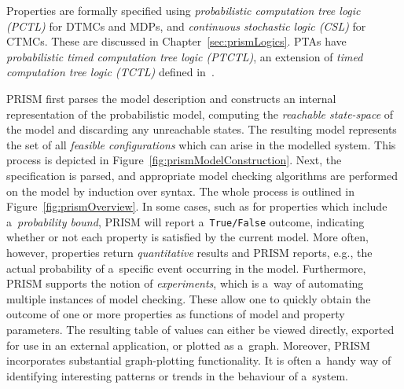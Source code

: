 \documentclass[a4paper, 11pt]{article}
\theoremstyle{definition}
\begin{document}
Properties are formally specified using \emph{probabilistic computation
tree logic (PCTL)} for DTMCs and MDPs, and \emph{continuous stochastic
logic (CSL)} for CTMCs. These are discussed in Chapter~\ref{sec:prismLogics}.
PTAs have \emph{probabilistic timed computation tree logic (PTCTL)}, an
extension of \emph{timed computation tree logic (TCTL)} defined
in~\cite{principlesOfModelCheck}.

PRISM first parses the model description and constructs an internal
representation of the probabilistic model, computing the \emph{reachable
state-space} of the model and discarding any unreachable states. The resulting
model represents the set of all \emph{feasible configurations} which can arise
in the modelled system. This process is depicted in
Figure~\ref{fig:prismModelConstruction}. Next, the specification is parsed, and
appropriate model checking algorithms are performed on the model by induction
over syntax. The whole process is outlined in
Figure~\ref{fig:prismOverview}. In some cases, such as for properties
which include a~\emph{probability bound}, PRISM will report
a~\texttt{True/False} outcome, indicating whether or not each property is
satisfied by the current model. More often, however, properties return
\emph{quantitative} results and PRISM reports, e.g., the actual probability
of a~specific event occurring in the model. Furthermore, PRISM supports the
notion of \emph{experiments}, which is a~way of automating multiple instances
of model checking. These allow one to quickly obtain the outcome of one or
more properties as functions of model and property parameters. The resulting
table of values can either be viewed directly, exported for use in an
external application, or plotted as a~graph. Moreover, PRISM incorporates
substantial graph-plotting functionality. It is often a~handy way
of identifying interesting patterns or trends in the behaviour of a~system.
\end{document}
